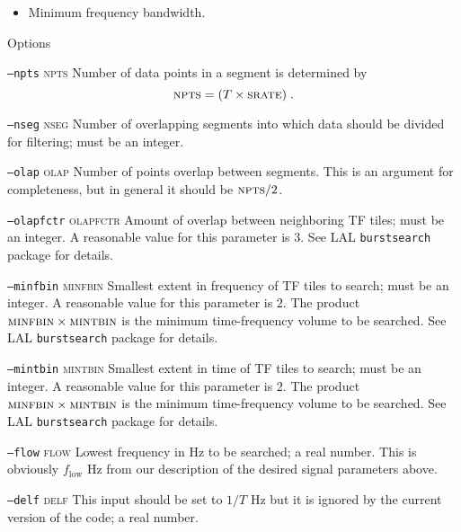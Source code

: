 \begin{entry}
\begin{itemize}
\item Minimum frequency bandwidth.
\end{itemize}

\item[Options]\leavevmode
\begin{entry}
\item[\texttt{--npts}  \textsc{npts}] Number of data points in a
segment is determined by
\[
\mbox{\textsc{npts}} = (T \times \mbox{\textsc{srate}}) \; .
\]  

\item[\texttt{--nseg} \textsc{nseg}] Number of overlapping segments into
which data should be divided for filtering;  must be an integer. 

\item[\texttt{--olap} \textsc{olap}] Number of points overlap between
segments.  This is an argument for completeness,  but in general it
should be $\textsc{npts}/2$.

\item[\texttt{--olapfctr} \textsc{olapfctr}] Amount of overlap between
neighboring TF tiles; must be an integer.  A reasonable value for this
parameter is $3$.  See LAL \texttt{burstsearch} package for details.  

\item[\texttt{--minfbin} \textsc{minfbin}] Smallest extent in frequency of
TF tiles to search;  must be an integer.  A reasonable value for this
parameter is $2$.   The product $\mbox{\textsc{minfbin}} \times
\mbox{\textsc{mintbin}}$ is the minimum time-frequency volume to
be searched.  See LAL \texttt{burstsearch} package for details.

\item[\texttt{--mintbin} \textsc{mintbin}] Smallest extent in time of TF
tiles to search;  must be an integer. A reasonable value for this
parameter is $2$.   The product $\mbox{\textsc{minfbin}} \times
\mbox{\textsc{mintbin}}$ is the minimum time-frequency volume to
be searched.  See LAL \texttt{burstsearch} package for details.

\item[\texttt{--flow} \textsc{flow}] Lowest frequency in Hz to be searched;
a real number.  This is obviously $f_{\mathrm{low}}$ Hz from our
description of the desired signal parameters above.

\item[\texttt{--delf} \textsc{delf}] This input should be set to $1/T$ Hz but
it is ignored by the current version of the code;
a real number.


\end{entry}
\end{entry}
